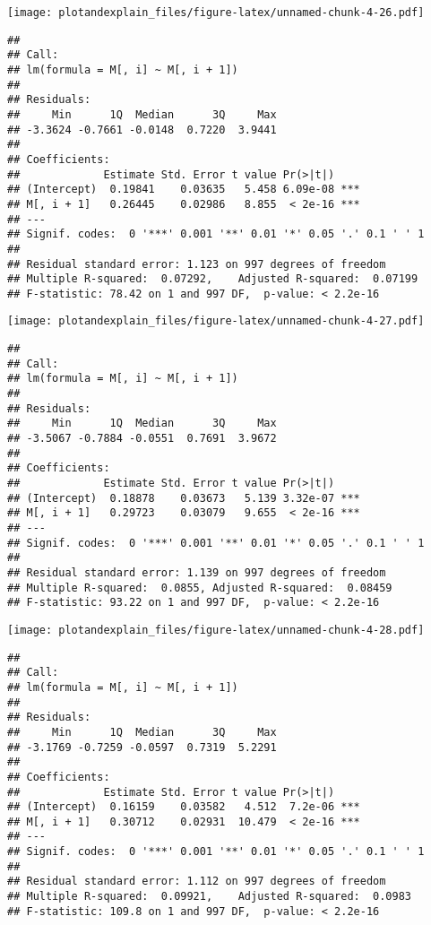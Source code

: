 \documentclass[]{article}
\begin{document}
\texttt{[image: plotandexplain\_files/figure-latex/unnamed-chunk-4-26.pdf]}

\begin{verbatim}
## 
## Call:
## lm(formula = M[, i] ~ M[, i + 1])
## 
## Residuals:
##     Min      1Q  Median      3Q     Max 
## -3.3624 -0.7661 -0.0148  0.7220  3.9441 
## 
## Coefficients:
##             Estimate Std. Error t value Pr(>|t|)    
## (Intercept)  0.19841    0.03635   5.458 6.09e-08 ***
## M[, i + 1]   0.26445    0.02986   8.855  < 2e-16 ***
## ---
## Signif. codes:  0 '***' 0.001 '**' 0.01 '*' 0.05 '.' 0.1 ' ' 1
## 
## Residual standard error: 1.123 on 997 degrees of freedom
## Multiple R-squared:  0.07292,    Adjusted R-squared:  0.07199 
## F-statistic: 78.42 on 1 and 997 DF,  p-value: < 2.2e-16
\end{verbatim}

\texttt{[image: plotandexplain\_files/figure-latex/unnamed-chunk-4-27.pdf]}

\begin{verbatim}
## 
## Call:
## lm(formula = M[, i] ~ M[, i + 1])
## 
## Residuals:
##     Min      1Q  Median      3Q     Max 
## -3.5067 -0.7884 -0.0551  0.7691  3.9672 
## 
## Coefficients:
##             Estimate Std. Error t value Pr(>|t|)    
## (Intercept)  0.18878    0.03673   5.139 3.32e-07 ***
## M[, i + 1]   0.29723    0.03079   9.655  < 2e-16 ***
## ---
## Signif. codes:  0 '***' 0.001 '**' 0.01 '*' 0.05 '.' 0.1 ' ' 1
## 
## Residual standard error: 1.139 on 997 degrees of freedom
## Multiple R-squared:  0.0855, Adjusted R-squared:  0.08459 
## F-statistic: 93.22 on 1 and 997 DF,  p-value: < 2.2e-16
\end{verbatim}

\texttt{[image: plotandexplain\_files/figure-latex/unnamed-chunk-4-28.pdf]}

\begin{verbatim}
## 
## Call:
## lm(formula = M[, i] ~ M[, i + 1])
## 
## Residuals:
##     Min      1Q  Median      3Q     Max 
## -3.1769 -0.7259 -0.0597  0.7319  5.2291 
## 
## Coefficients:
##             Estimate Std. Error t value Pr(>|t|)    
## (Intercept)  0.16159    0.03582   4.512  7.2e-06 ***
## M[, i + 1]   0.30712    0.02931  10.479  < 2e-16 ***
## ---
## Signif. codes:  0 '***' 0.001 '**' 0.01 '*' 0.05 '.' 0.1 ' ' 1
## 
## Residual standard error: 1.112 on 997 degrees of freedom
## Multiple R-squared:  0.09921,    Adjusted R-squared:  0.0983 
## F-statistic: 109.8 on 1 and 997 DF,  p-value: < 2.2e-16
\end{verbatim}
\end{document}
